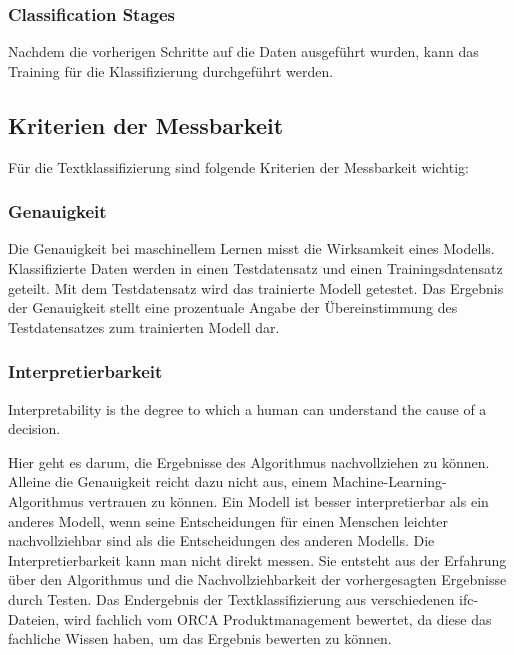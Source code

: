 \subsubsection{Classification Stages}
Nachdem die vorherigen Schritte auf die Daten ausgeführt wurden, kann das Training für die Klassifizierung durchgeführt werden.

\subsection{Kriterien der Messbarkeit}
\label{c:conception:classification:criteria}
Für die Textklassifizierung sind folgende Kriterien der Messbarkeit wichtig:

\subsubsection{Genauigkeit}
Die Genauigkeit bei maschinellem Lernen misst die Wirksamkeit eines Modells. Klassifizierte Daten werden in einen Testdatensatz und einen Trainingsdatensatz geteilt. Mit dem Testdatensatz wird das trainierte Modell getestet. Das Ergebnis der Genauigkeit stellt eine prozentuale Angabe der Übereinstimmung des Testdatensatzes zum trainierten Modell dar. \citep[vgl.][]{select_ml_2021}

\subsubsection{Interpretierbarkeit}
\begin{definition}[Interpretierbarkeit]
	\label{def:interpretability}
	\glqq Interpretability is the degree to which a human can understand the cause of a decision.\grqq{}\citep{miller_2017}
\end{definition}
Hier geht es darum, die Ergebnisse des Algorithmus nachvollziehen zu können. Alleine die Genauigkeit reicht dazu nicht aus, einem Machine-Learning-Algorithmus vertrauen zu können.
Ein Modell ist besser interpretierbar als ein anderes Modell, wenn seine Entscheidungen für einen Menschen leichter nachvollziehbar sind als die Entscheidungen des anderen Modells. Die Interpretierbarkeit kann man nicht direkt messen. Sie entsteht aus der Erfahrung über den Algorithmus und die Nachvollziehbarkeit der vorhergesagten Ergebnisse durch Testen.  \citep[vgl.][]{molnar2022} Das Endergebnis der Textklassifizierung aus verschiedenen \ac{ifc}-Dateien, wird fachlich vom ORCA Produktmanagement bewertet, da diese das fachliche Wissen haben, um das Ergebnis bewerten zu können.

